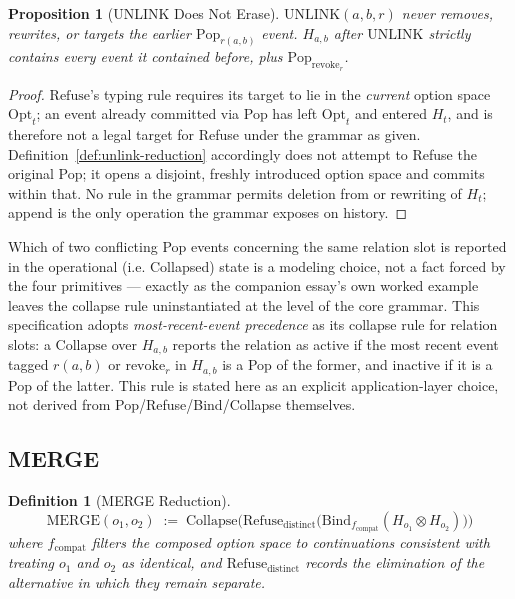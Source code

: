 \documentclass[11pt]{article}
\newtheorem{definition}{Definition}[section]
\newtheorem{proposition}{Proposition}[section]
\begin{document}
\begin{proposition}[UNLINK Does Not Erase]
\label{prop:unlink-nonerasure}
$\mathrm{UNLINK}(a,b,r)$ never removes, rewrites, or targets the earlier $\mathrm{Pop}_{r(a,b)}$ event. $H_{a,b}$ after $\mathrm{UNLINK}$ strictly contains every event it contained before, plus $\mathrm{Pop}_{\mathrm{revoke}_r}$.
\end{proposition}
\begin{proof}
$\mathrm{Refuse}$'s typing rule requires its target to lie in the \emph{current} option space $\mathrm{Opt}_t$; an event already committed via Pop has left $\mathrm{Opt}_t$ and entered $H_t$, and is therefore not a legal target for Refuse under the grammar as given. Definition~\ref{def:unlink-reduction} accordingly does not attempt to Refuse the original Pop; it opens a disjoint, freshly introduced option space and commits within that. No rule in the grammar permits deletion from or rewriting of $H_t$; append is the only operation the grammar exposes on history.
\end{proof}

Which of two conflicting Pop events concerning the same relation slot is reported in the operational (i.e. Collapsed) state is a modeling choice, not a fact forced by the four primitives --- exactly as the companion essay's own worked example leaves the collapse rule uninstantiated at the level of the core grammar. This specification adopts \emph{most-recent-event precedence} as its collapse rule for relation slots: a $\mathrm{Collapse}$ over $H_{a,b}$ reports the relation as active if the most recent event tagged $r(a,b)$ or $\mathrm{revoke}_r$ in $H_{a,b}$ is a Pop of the former, and inactive if it is a Pop of the latter. This rule is stated here as an explicit application-layer choice, not derived from Pop/Refuse/Bind/Collapse themselves.

\subsection{MERGE}

\begin{definition}[MERGE Reduction]
\label{def:merge-reduction}
\[
\mathrm{MERGE}(o_1,o_2) \;:=\;
\mathrm{Collapse}\Big(
\mathrm{Refuse}_{\mathrm{distinct}}\big(
\mathrm{Bind}_{f_{\mathrm{compat}}}(H_{o_1} \otimes H_{o_2})
\big)
\Big)
\]
where $f_{\mathrm{compat}}$ filters the composed option space to continuations consistent with treating $o_1$ and $o_2$ as identical, and $\mathrm{Refuse}_{\mathrm{distinct}}$ records the elimination of the alternative in which they remain separate.
\end{definition}
\end{document}
